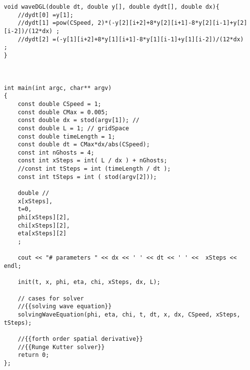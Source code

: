 \documentclass[10pt,fleqn,reqno,a4paper]{article}
\begin{document}
\begin{verbatim}
void waveDGL(double dt, double y[], double dydt[], double dx){
    //dydt[0] =y[1];
    //dydt[1] =pow(CSpeed, 2)*(-y[2][i+2]+8*y[2][i+1]-8*y[2][i-1]+y[2][i-2])/(12*dx) ;
    //dydt[2] =(-y[1][i+2]+8*y[1][i+1]-8*y[1][i-1]+y[1][i-2])/(12*dx) ;
}



int main(int argc, char** argv)
{
    const double CSpeed = 1;
    const double CMax = 0.005;
    const double dx = stod(argv[1]); //
    const double L = 1; // gridSpace
    const double timeLength = 1;
    const double dt = CMax*dx/abs(CSpeed);
    const int nGhosts = 4;
    const int xSteps = int( L / dx ) + nGhosts;
    //const int tSteps = int (timeLength / dt );
    const int tSteps = int ( stod(argv[2]));

    double //
    x[xSteps],
    t=0,
    phi[xSteps][2],
    chi[xSteps][2],
    eta[xSteps][2]
    ;

    cout << "# parameters " << dx << ' ' << dt << ' ' <<  xSteps << endl;

    init(t, x, phi, eta, chi, xSteps, dx, L);

    // cases for solver
    //{{solving wave equation}}
    solvingWaveEquation(phi, eta, chi, t, dt, x, dx, CSpeed, xSteps, tSteps);

    //{{forth order spatial derivative}}
    //{{Runge Kutter solver}}
	return 0;
};
\end{verbatim}
\end{document}
